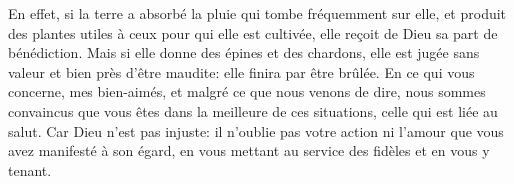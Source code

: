 En effet, si la terre a absorbé la pluie qui tombe fréquemment sur elle,
	et produit des plantes utiles à ceux pour qui elle est cultivée,
	elle reçoit de Dieu sa part de bénédiction.
Mais si elle donne des épines et des chardons,
	elle est jugée sans valeur et bien près d’être maudite:
	elle finira par être brûlée.
En ce qui vous concerne, mes bien-aimés, et malgré ce que nous venons de dire,
	nous sommes convaincus que vous êtes dans la meilleure de ces situations,
	celle qui est liée au salut.
Car Dieu n’est pas injuste:
	il n’oublie pas votre action ni l’amour que vous avez manifesté à son égard,
	en vous mettant au service des fidèles et en vous y tenant.
